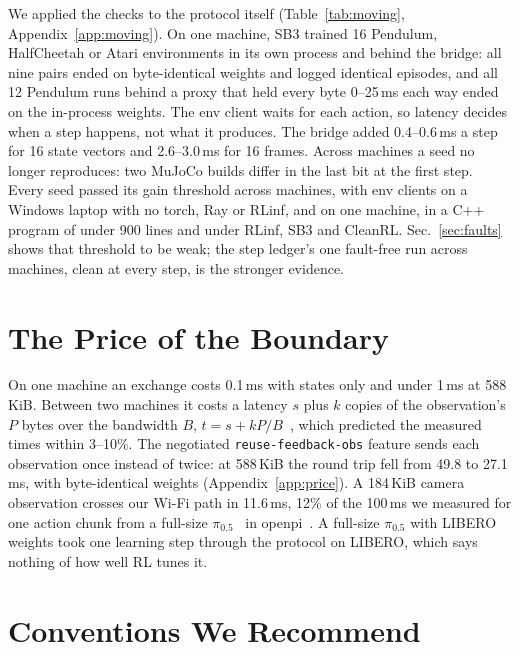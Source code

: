 \documentclass[conference]{IEEEtran}
\begin{document}
We applied the checks to the protocol itself (Table~\ref{tab:moving},
Appendix~\ref{app:moving}). On one machine, SB3 trained 16 Pendulum,
HalfCheetah or Atari environments in its own process and behind the
bridge: all nine pairs ended on byte-identical weights and logged identical
episodes, and all 12 Pendulum runs behind a proxy that held
every byte 0--25\,ms each way ended on the in-process weights. The env client waits for each action,
so latency decides when a step happens, not what it produces. The bridge
added 0.4--0.6\,ms a step for 16 state vectors and 2.6--3.0\,ms for 16
frames. Across machines a seed no longer reproduces: two MuJoCo builds
differ in the last bit at the first step. Every seed passed its
gain threshold across machines, with env clients on a Windows laptop with
no torch, Ray or RLinf, and on one machine, in a C++ program of
under 900 lines and under RLinf, SB3 and CleanRL. Sec.~\ref{sec:faults} shows that threshold to be weak; the step
ledger's one fault-free run across machines, clean at every step, is the
stronger evidence.

\section{The Price of the Boundary}
\label{sec:price}

On one machine an exchange costs 0.1\,ms with states only and under 1\,ms
at 588\,KiB. Between two machines it costs a latency $s$ plus $k$ copies of
the observation's $P$ bytes over the bandwidth $B$, $t = s +
kP/B$~\cite{hockney1994communication}, which predicted the measured times
within 3--10\%. The negotiated \texttt{reuse-feedback-obs} feature
sends each observation once instead of twice: at 588\,KiB the round trip
fell from 49.8 to 27.1\,ms, with byte-identical weights
(Appendix~\ref{app:price}). A 184\,KiB camera observation crosses our Wi-Fi
path in 11.6\,ms, 12\% of the 100\,ms we measured for one action chunk from
a full-size $\pi_{0.5}$~\cite{intelligence2025pi05} in openpi~\cite{openpi2025}.
A full-size $\pi_{0.5}$ with LIBERO weights took one learning step through
the protocol on LIBERO, which says nothing of how well RL tunes it.

\section{Conventions We Recommend}
\label{sec:conventions}
\end{document}
